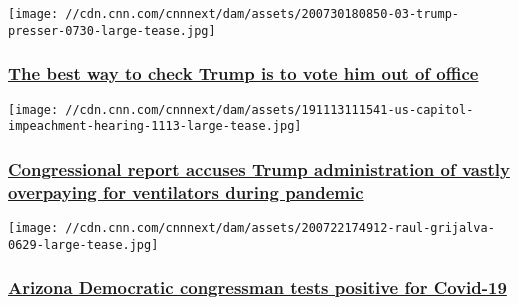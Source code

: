 \href{/2020/08/01/opinions/trump-delay-election-abuse-of-power-zelizer/index.html}{}

\texttt{[image: //cdn.cnn.com/cnnnext/dam/assets/200730180850-03-trump-presser-0730-large-tease.jpg]}

\hypertarget{the-best-way-to-check-trump-is-to-vote-him-out-of-office}{%
\subsubsection{\texorpdfstring{\href{/2020/08/01/opinions/trump-delay-election-abuse-of-power-zelizer/index.html}{The
best way to check Trump is to vote him out of
office}}{The best way to check Trump is to vote him out of office}}\label{the-best-way-to-check-trump-is-to-vote-him-out-of-office}}

\href{/2020/07/31/politics/congress-ventilator-report-released/index.html}{}

\texttt{[image: //cdn.cnn.com/cnnnext/dam/assets/191113111541-us-capitol-impeachment-hearing-1113-large-tease.jpg]}

\hypertarget{congressional-report-accuses-trump-administration-of-vastly-overpaying-for-ventilators-during-pandemic}{%
\subsubsection{\texorpdfstring{\href{/2020/07/31/politics/congress-ventilator-report-released/index.html}{Congressional
report accuses Trump administration of vastly overpaying for ventilators
during
pandemic}}{Congressional report accuses Trump administration of vastly overpaying for ventilators during pandemic}}\label{congressional-report-accuses-trump-administration-of-vastly-overpaying-for-ventilators-during-pandemic}}

\href{/2020/08/01/politics/raul-grijalva-tests-positive-covid-19/index.html}{}

\texttt{[image: //cdn.cnn.com/cnnnext/dam/assets/200722174912-raul-grijalva-0629-large-tease.jpg]}

\hypertarget{arizona-democratic-congressman-tests-positive-for-covid-19}{%
\subsubsection{\texorpdfstring{\href{/2020/08/01/politics/raul-grijalva-tests-positive-covid-19/index.html}{Arizona
Democratic congressman tests positive for
Covid-19}}{Arizona Democratic congressman tests positive for Covid-19}}\label{arizona-democratic-congressman-tests-positive-for-covid-19}}

